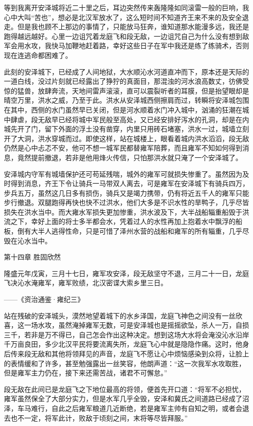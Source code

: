 等到我离开安泽城将近二十里之后，耳边突然传来轰隆隆如同滚雷一般的巨响，我心中大叫“苦也”，想必是北汉军放水了，这么短时间不知道齐王来不来的及安全退走。但是我也顾不上那边的事情了，只能放马狂奔，谁知道那水能漫多远，我还是跑得越远越好。心里一边诅咒着龙庭飞和段无敌，一边诅咒自己为什么没有想到敌军会用水攻，我快马加鞭地赶着路，幸好这些日子在军中我还是练了练骑术，否则现在连逃命都困难了。

此刻的安泽城下，已经成了人间地狱，大水顺沁水河道直冲而下，原本还是天际的一道白线，没过片刻就已经露出了狰狞的真面目，那混浊的河水浪高数丈，彷佛受惊的猛兽，放肆奔流，天地间雷声滚滚，直可以震裂听者的耳膜，但是抬望眼却是晴空万里，洪水之威，乃至于此。洪水从安泽城西侧擦肩而过，转瞬将安泽城包围在其中，西侧的水门虽然早已关闭，但是河水顺着水门冲入城中，汹涌的狂潮在城中肆虐，段无敌早已经将城中军民般至高处，又已经安排好泻水的孔洞，却是在内城先开了门，留下外面的浮土没有凿穿，内里只用砖石堵塞，洪水一过，城墙立刻开了大洞，洪水穿城而过。即使这样，站在城楼上，眼看着城内洪水滔滔，段无敌仍然是心中忐忑不安，他可不想一城军民都替雍军陪葬，而且雍军不知如何得到消息，竟然提前撤退，若非是他用烽火传信，只怕那洪水就只淹了一个安泽城了。

安泽城内守军有城墙保护还可苟延残喘，城外的雍军可就损失惨重了。虽然因为及时得到消息，齐王下令让骑兵一马带双人离去，可是雍军在安泽城下有骑兵四万，步兵五万，虽然这几日多有损伤，骑兵又是竭力携带，仍有将近五千人的雍军只能步行撤退。双腿跑得再快也快不过洪水，他们大多是不识水性的旱鸭子，几乎尽皆损失在洪水当中。而大雍水军损失更加惨重，洪水波及下，大半战船辎重船毁于洪流之下，幸好上面的将士多半都会水，凭着过人的水性再加上抱着水中飘浮的船板，倒有大半人逃得性命，只是可惜了泽州水营的战船和雍军的所有辎重，几乎尽毁在沁水当中。

第十四章    胜固欣然

隆盛元年戊寅，三月十七日，雍军攻安泽，段无敌坚守不退，三月二十一日，龙庭飞决沁水淹雍军，雍军败绩，北汉密谍大索乡里三日。

——《资治通鉴·雍纪三》

站在残破的安泽城头，漠然地望着城下的水乡泽国，龙庭飞神色之间没有一丝欣喜，这一场水攻，虽然淹掉雍军无数，可是安泽城也是摇摇欲坠，杀人一万，自损三千，若非是万不得已，自己怎会作出这种决定。想到这场大水将会淹没沁水沿岸千万亩良田，多少北汉平民将要流离失所，龙庭飞心中就是隐隐作痛。这时，他身后传来段无敌和其他将领拜见的声音，龙庭飞不愿让心中烦恼感染到众将，让脸上的表情缓和了许多，甚至勉强露出一丝笑容，他朗声道：“这一次我军水攻取胜，但是雍军主力仍在，接下来还需苦战，诸君不可懈怠。”

段无敌在此间已是龙庭飞之下地位最高的将领，便首先开口道：“将军不必担忧，雍军虽然保全了大部分实力，但是水军几乎全毁，安泽和冀氏之间道路已经成了沼泽，车马难行，自此之后雍军粮道几近断绝，若是雍军主帅有自知之明，或者会退去也不一定，将军此计，败敌于顷刻之间，末将等尽皆拜服。”

